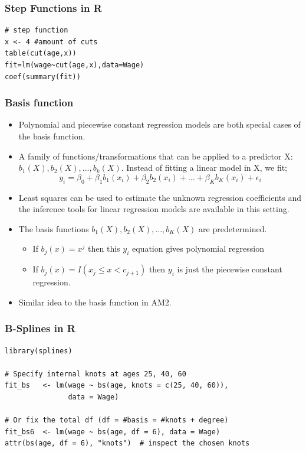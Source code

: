 \documentclass{article}
\begin{document}
\subsubsection{Step Functions in R}
\begin{lstlisting}
# step function
x <- 4 #amount of cuts
table(cut(age,x))
fit=lm(wage~cut(age,x),data=Wage)
coef(summary(fit))
\end{lstlisting}

\subsubsection{Basis function}
\begin{itemize}
    \item Polynomial and piecewise constant regression models are both special cases of the basis function.
    \item A family of functions/transformations that can be applied to a predictor X: $b_1(X), b_2(X) , ... , b_k(X)$. Instead of fitting a linear model in X, we fit;
    \begin{equation*}
        y_i = \beta_0 + \beta_1 b_1(x_i) + \beta_2 b_2 (x_i) + ... + \beta_K b_K (x_i) + \epsilon_i
    \end{equation*}
    \item Least squares can be used to estimate the unknown regression coefficients and the inference tools for linear regression models are available in this setting.
    \item The basis functions $b_1(X), b_2(X), ..., b_K(X)$ are predetermined.
    \begin{itemize}
        \item If $b_j(x) = x^j$ then this $y_i$ equation gives polynomial regression
        \item If $b_j(x) = I(x_j\leq x < c_{j+1})$ then $y_i$ is just the piecewise constant regression.
    \end{itemize}
    \item Similar idea to the basis function in AM2.
\end{itemize}

\subsubsection{B-Splines in R}
\begin{lstlisting}
library(splines)

# Specify internal knots at ages 25, 40, 60
fit_bs   <- lm(wage ~ bs(age, knots = c(25, 40, 60)), 
               data = Wage)

# Or fix the total df (df = #basis = #knots + degree)
fit_bs6  <- lm(wage ~ bs(age, df = 6), data = Wage)
attr(bs(age, df = 6), "knots")  # inspect the chosen knots 
\end{lstlisting}
\end{document}
